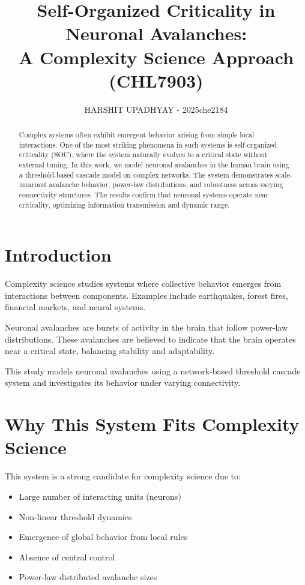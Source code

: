 \documentclass[12pt]{article}
\title{Self-Organized Criticality in Neuronal Avalanches:\\
A Complexity Science Approach (CHL7903)}
\author{HARSHIT UPADHYAY - 2025che2184}
\date{}
\begin{document}
\maketitle

\begin{abstract}
Complex systems often exhibit emergent behavior arising from simple local interactions. One of the most striking phenomena in such systems is self-organized criticality (SOC), where the system naturally evolves to a critical state without external tuning. In this work, we model neuronal avalanches in the human brain using a threshold-based cascade model on complex networks. The system demonstrates scale-invariant avalanche behavior, power-law distributions, and robustness across varying connectivity structures. The results confirm that neuronal systems operate near criticality, optimizing information transmission and dynamic range.
\end{abstract}

\section{Introduction}
Complexity science studies systems where collective behavior emerges from interactions between components. Examples include earthquakes, forest fires, financial markets, and neural systems.

Neuronal avalanches are bursts of activity in the brain that follow power-law distributions. These avalanches are believed to indicate that the brain operates near a critical state, balancing stability and adaptability.

This study models neuronal avalanches using a network-based threshold cascade system and investigates its behavior under varying connectivity.

\section{Why This System Fits Complexity Science}
This system is a strong candidate for complexity science due to:

\begin{itemize}
\item Large number of interacting units (neurons)
\item Non-linear threshold dynamics
\item Emergence of global behavior from local rules
\item Absence of central control
\item Power-law distributed avalanche sizes
\end{itemize}
\end{document}
